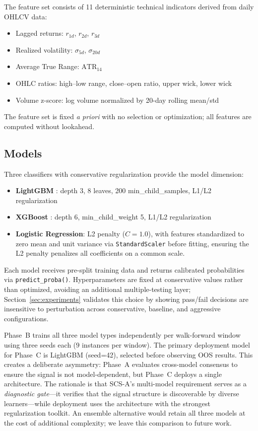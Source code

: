\documentclass[12pt,a4paper]{article}
\begin{document}
The feature set consists of 11 deterministic technical indicators derived from daily OHLCV data:

\begin{itemize}
  \item Lagged returns: $r_{1d}$, $r_{2d}$, $r_{3d}$
  \item Realized volatility: $\sigma_{5d}$, $\sigma_{20d}$
  \item Average True Range: $\text{ATR}_{14}$
  \item OHLC ratios: high--low range, close--open ratio, upper wick, lower wick
  \item Volume z-score: log volume normalized by 20-day rolling mean/std
\end{itemize}

The feature set is fixed \emph{a priori} with no selection or optimization; all features are computed without lookahead.

\subsection{Models}

Three classifiers with conservative regularization provide the model dimension:
\begin{itemize}
  \item \textbf{LightGBM} \citep{ke2017lightgbm}: depth 3, 8 leaves, 200 min\_child\_samples, L1/L2 regularization
  \item \textbf{XGBoost} \citep{chen2016xgboost}: depth 6, min\_child\_weight 5, L1/L2 regularization
  \item \textbf{Logistic Regression}: L2 penalty ($C=1.0$), with features standardized to zero mean and unit variance via \texttt{StandardScaler} before fitting, ensuring the L2 penalty penalizes all coefficients on a common scale.
\end{itemize}

Each model receives pre-split training data and returns calibrated probabilities via \texttt{predict\_proba()}. Hyperparameters are fixed at conservative values rather than optimized, avoiding an additional multiple-testing layer; Section~\ref{sec:experiments} validates this choice by showing pass/fail decisions are insensitive to perturbation across conservative, baseline, and aggressive configurations.

Phase~B trains all three model types independently per walk-forward window using three seeds each ($9$ instances per window). The primary deployment model for Phase~C is LightGBM (seed=42), selected before observing OOS results. This creates a deliberate asymmetry: Phase~A evaluates cross-model consensus to ensure the signal is not model-dependent, but Phase~C deploys a single architecture. The rationale is that SCS-A's multi-model requirement serves as a \emph{diagnostic gate}---it verifies that the signal structure is discoverable by diverse learners---while deployment uses the architecture with the strongest regularization toolkit. An ensemble alternative would retain all three models at the cost of additional complexity; we leave this comparison to future work.
\end{document}
